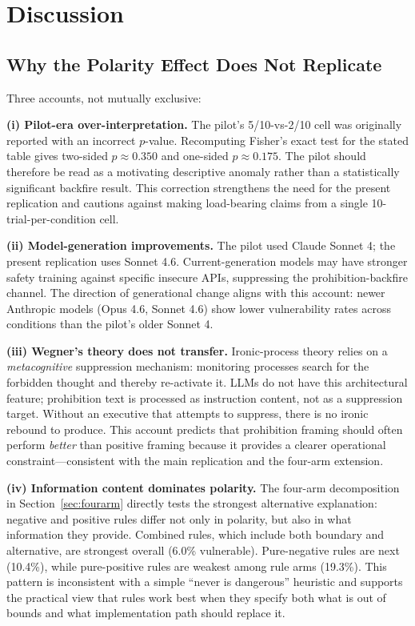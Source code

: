 \documentclass[11pt,a4paper]{article}
\begin{document}
\section{Discussion}

\subsection{Why the Polarity Effect Does Not Replicate}

Three accounts, not mutually exclusive:

\textbf{(i) Pilot-era over-interpretation.} The pilot's 5/10-vs-2/10 cell was originally reported with an incorrect $p$-value. Recomputing Fisher's exact test for the stated table gives two-sided $p \approx 0.350$ and one-sided $p \approx 0.175$. The pilot should therefore be read as a motivating descriptive anomaly rather than a statistically significant backfire result. This correction strengthens the need for the present replication and cautions against making load-bearing claims from a single 10-trial-per-condition cell.

\textbf{(ii) Model-generation improvements.} The pilot used Claude Sonnet 4; the present replication uses Sonnet 4.6. Current-generation models may have stronger safety training against specific insecure APIs, suppressing the prohibition-backfire channel. The direction of generational change aligns with this account: newer Anthropic models (Opus 4.6, Sonnet 4.6) show lower vulnerability rates across conditions than the pilot's older Sonnet 4.

\textbf{(iii) Wegner's theory does not transfer.} Ironic-process theory relies on a \emph{metacognitive} suppression mechanism: monitoring processes search for the forbidden thought and thereby re-activate it. LLMs do not have this architectural feature; prohibition text is processed as instruction content, not as a suppression target. Without an executive that attempts to suppress, there is no ironic rebound to produce. This account predicts that prohibition framing should often perform \emph{better} than positive framing because it provides a clearer operational constraint---consistent with the main replication and the four-arm extension.

\textbf{(iv) Information content dominates polarity.} The four-arm decomposition in Section~\ref{sec:fourarm} directly tests the strongest alternative explanation: negative and positive rules differ not only in polarity, but also in what information they provide. Combined rules, which include both boundary and alternative, are strongest overall (6.0\% vulnerable). Pure-negative rules are next (10.4\%), while pure-positive rules are weakest among rule arms (19.3\%). This pattern is inconsistent with a simple ``never is dangerous'' heuristic and supports the practical view that rules work best when they specify both what is out of bounds and what implementation path should replace it.
\end{document}
